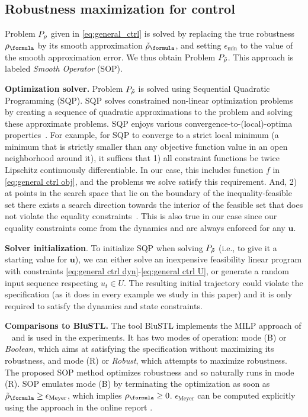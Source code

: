\subsection{Robustness maximization for control}
\label{sec:toy example}
Problem $P_\rho$ given in \eqref{eq:general_ctrl} is solved by replacing the true robustness $\robf$ by its smooth approximation $\srobf$, and setting $\epsilon_{\text{min}}$ to the value of the smooth approximation error.
We thus obtain Problem $P_{\tilde{\rho}}$. 
This approach is labeled \textit{Smooth Operator} (SOP).

\textbf{Optimization solver.}
Problem $P_{\tilde{\rho}}$ is solved using Sequential Quadratic Programming (SQP).
SQP solves constrained non-linear optimization problems by creating a sequence of quadratic approximations to the problem and solving these approximate problems.
SQP enjoys various convergence-to-(local)-optima properties~\cite[Section 2.9]{Polak97_Optim}.
For example, for SQP to converge to a strict local minimum (a minimum that is strictly smaller than any objective function value in an open neighborhood around it), it suffices that 
1) all constraint functions be twice Lipschitz continuously differentiable. 
In our case, this includes function $f$ in \eqref{eq:general ctrl obj}, and the problems we solve satisfy this requirement.
And, 
2) at points in the search space that lie on the boundary of the inequality-feasible set
there exists a search direction towards the interior of the feasible set that does not violate the equality constraints~\cite[Assumption 2.9.1]{Polak97_Optim}. 
This is also true in our case since our equality constraints come from the dynamics and are always enforced for any $\mathbf{u}$.

\textbf{Solver initialization}.
To initialize SQP when solving $P_{\tilde{\rho}}$ (i.e., to give it a starting value for $\mathbf{u}$), we can either solve an inexpensive feasibility linear program with constraints \eqref{eq:general ctrl dyn}-\eqref{eq:general ctrl U}, 
or generate a random input sequence respecting $u_t \in U$. 
The resulting initial trajectory could violate the specification (as it does in every example we study in this paper) and it is only required to satisfy the dynamics and state constraints.

\textbf{Comparisons to BluSTL.}
The tool BluSTL implements the MILP approach of ~\cite{Raman14_MPCSTL} and is used in the experiments.
It has two modes of operation: mode (B) or \textit{Boolean}, which aims at satisfying the specification without maximizing its robustness, and mode (R) or \textit{Robust}, which attempts to maximize robustness. 
The proposed SOP method optimizes robustness and so naturally runs in mode (R).
SOP emulates mode (B) by terminating the optimization as soon as $\srobf \geq \epsilon_{\text{Meyer}}$, which implies $\rob_{\formula} \geq 0$. $\epsilon_{\text{Meyer}}$ can be computed explicitly using the approach in the online report \cite{PantAM17_SmoothOpTechRpt}.



%
